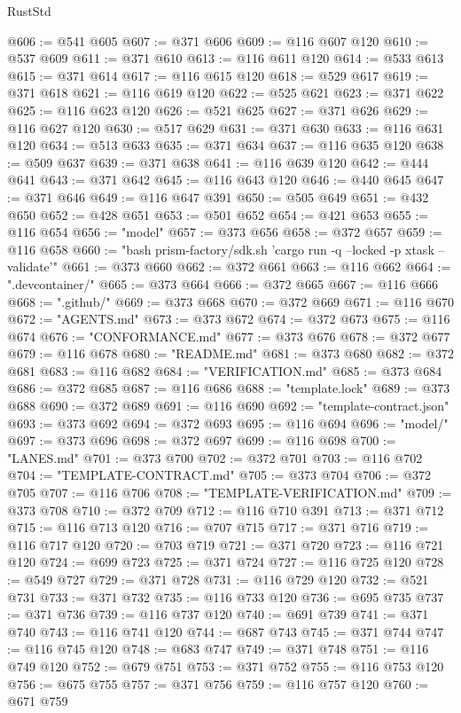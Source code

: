\begin{lexlean}{RustStd}
\begin{coremodule}
@606 := @541 @605
@607 := @371 @606
@609 := @116 @607 @120
@610 := @537 @609
@611 := @371 @610
@613 := @116 @611 @120
@614 := @533 @613
@615 := @371 @614
@617 := @116 @615 @120
@618 := @529 @617
@619 := @371 @618
@621 := @116 @619 @120
@622 := @525 @621
@623 := @371 @622
@625 := @116 @623 @120
@626 := @521 @625
@627 := @371 @626
@629 := @116 @627 @120
@630 := @517 @629
@631 := @371 @630
@633 := @116 @631 @120
@634 := @513 @633
@635 := @371 @634
@637 := @116 @635 @120
@638 := @509 @637
@639 := @371 @638
@641 := @116 @639 @120
@642 := @444 @641
@643 := @371 @642
@645 := @116 @643 @120
@646 := @440 @645
@647 := @371 @646
@649 := @116 @647 @391
@650 := @505 @649
@651 := @432 @650
@652 := @428 @651
@653 := @501 @652
@654 := @421 @653
@655 := @116 @654
@656 := "model"
@657 := @373 @656
@658 := @372 @657
@659 := @116 @658
@660 := "bash prism-factory/sdk.sh 'cargo run -q --locked -p xtask -- validate'"
@661 := @373 @660
@662 := @372 @661
@663 := @116 @662
@664 := ".devcontainer/"
@665 := @373 @664
@666 := @372 @665
@667 := @116 @666
@668 := ".github/"
@669 := @373 @668
@670 := @372 @669
@671 := @116 @670
@672 := "AGENTS.md"
@673 := @373 @672
@674 := @372 @673
@675 := @116 @674
@676 := "CONFORMANCE.md"
@677 := @373 @676
@678 := @372 @677
@679 := @116 @678
@680 := "README.md"
@681 := @373 @680
@682 := @372 @681
@683 := @116 @682
@684 := "VERIFICATION.md"
@685 := @373 @684
@686 := @372 @685
@687 := @116 @686
@688 := "template.lock"
@689 := @373 @688
@690 := @372 @689
@691 := @116 @690
@692 := "template-contract.json"
@693 := @373 @692
@694 := @372 @693
@695 := @116 @694
@696 := "model/"
@697 := @373 @696
@698 := @372 @697
@699 := @116 @698
@700 := "LANES.md"
@701 := @373 @700
@702 := @372 @701
@703 := @116 @702
@704 := "TEMPLATE-CONTRACT.md"
@705 := @373 @704
@706 := @372 @705
@707 := @116 @706
@708 := "TEMPLATE-VERIFICATION.md"
@709 := @373 @708
@710 := @372 @709
@712 := @116 @710 @391
@713 := @371 @712
@715 := @116 @713 @120
@716 := @707 @715
@717 := @371 @716
@719 := @116 @717 @120
@720 := @703 @719
@721 := @371 @720
@723 := @116 @721 @120
@724 := @699 @723
@725 := @371 @724
@727 := @116 @725 @120
@728 := @549 @727
@729 := @371 @728
@731 := @116 @729 @120
@732 := @521 @731
@733 := @371 @732
@735 := @116 @733 @120
@736 := @695 @735
@737 := @371 @736
@739 := @116 @737 @120
@740 := @691 @739
@741 := @371 @740
@743 := @116 @741 @120
@744 := @687 @743
@745 := @371 @744
@747 := @116 @745 @120
@748 := @683 @747
@749 := @371 @748
@751 := @116 @749 @120
@752 := @679 @751
@753 := @371 @752
@755 := @116 @753 @120
@756 := @675 @755
@757 := @371 @756
@759 := @116 @757 @120
@760 := @671 @759

\end{coremodule}
\end{lexlean}
